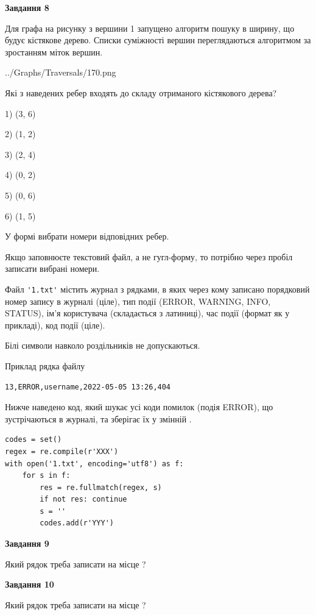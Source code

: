 \documentclass[12pt, ukrainian]{article}
\def\code#1{\Verb!#1!}
\begin{document}
{\begin {large}
{\begin {center}\textbf{Завдання 8}\end {center}}\par
Для графа на рисунку з вершини 1 запущено алгоритм пошуку в ширину, що будує кістякове дерево. Списки суміжності вершин переглядаються алгоритмом за зростанням міток вершин.\par
\begin{center}
	{../Graphs/Traversals/170.png}
\end{center}
\par Які з наведених ребер входять до складу отриманого кістякового дерева?\par
1) (3, 6)\par
2) (1, 2)\par
3) (2, 4)\par
4) (0, 2)\par
5) (0, 6)\par
6) (1, 5)\par
{\vskip 15pt} У формі вибрати номери відповідних ребер.


Якщо заповнюєте текстовий файл, а не гугл-форму, то потрібно через пробіл записа\-ти вибрані номери.\par
\newpage


Файл \code{'1.txt'} містить журнал з рядками, в яких через кому записано поряд\-ко\-вий номер запису в журналі (ціле), тип події (ERROR, WARNING, INFO, STATUS), ім'я користувача (складається з латиниці), час події (фор\-мат як у прикладі), код події (ціле).

Білі символи навколо роздільників не допускаються.

Приклад рядка файлу



\begin{verbatim}
13,ERROR,username,2022-05-05 13:26,404
\end{verbatim}


Нижче наведено код, який шукає усі коди помилок (подія ERROR), що зустріча\-ють\-ся в журналі, та зберігає їх у змінній .



\begin{verbatim}
codes = set()
regex = re.compile(r'XXX')
with open('1.txt', encoding='utf8') as f:
    for s in f:
        res = re.fullmatch(regex, s)
        if not res: continue
        s = ''
        codes.add(r'YYY')
\end{verbatim}


{\begin {center}\textbf{Завдання 9}\end {center}}\par
Який рядок треба записати на місце  ?\par
\vspace{5mm}


{\begin {center}\textbf{Завдання 10}\end {center}}\par
Який рядок треба записати на місце  ?\par


\newpage


\end {large}}
\end{document}
